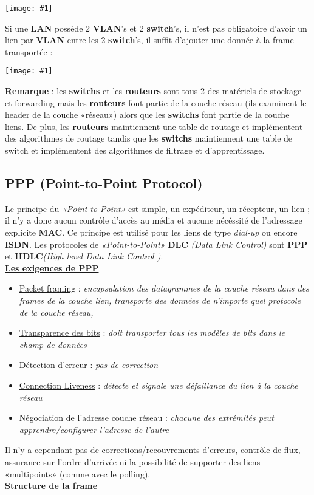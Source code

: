 \documentclass{article}
\newcommand{\ora}[1]{\textcolor{darko}{#1}}
\newcommand{\imgR}[2]{\begin{center}\texttt{[image: \#1]}\end{center}}
\newcommand{\point}[2]{\item \ora{\underline{#1}} : \textit{#2}}
\newcommand{\stitre}[1]{\noindent\textbf{\underline{#1}} \\}
\begin{document}
\imgR{CN_127.png}{250}

\noindent Si une \textbf{LAN} possède 2 \textbf{VLAN}'s et 2 \textbf{switch}'s, il n'est pas obligatoire d'avoir 
un lien par \textbf{VLAN} entre les 2 \textbf{switch}'s, il suffit d'ajouter une donnée à la frame transportée :

\imgR{CN_128.png}{300}

\noindent\underline{\textbf{Remarque}} : les \textbf{switchs} et les \textbf{routeurs} sont tous 2 des matériels 
de stockage et forwarding mais les \textbf{routeurs} font partie de la couche réseau (ils examinent le header 
de la couche «réseau») alors que les \textbf{switchs} font partie de la couche liens. De plus, les 
\textbf{routeurs} maintiennent une table de routage et implémentent des algorithmes de routage tandis que les 
\textbf{switchs} maintiennent une table de switch et implémentent des algorithmes de filtrage et d'apprentissage.

\subsection{PPP (Point-to-Point Protocol)}

Le principe du \textit{«Point-to-Point»} est simple, un expéditeur, un récepteur, un lien ; il n'y a donc aucun 
contrôle d'accès au média et aucune nécéssité de l'adressage explicite \textbf{MAC}. Ce principe est utilisé pour
les liens de type \textit{dial-up} ou encore \textbf{ISDN}. Les protocoles de \textit{«Point-to-Point»} 
\textbf{DLC} \textit{(Data Link Control)} sont \textbf{PPP} et \textbf{HDLC}\textit{(High level Data Link Control 
)}. \\

\stitre{Les exigences de PPP}
\begin{itemize}
\point{Packet framing}{encapsulation des datagrammes de la couche réseau dans des frames de la couche lien, 
transporte des données de n'importe quel protocole de la couche réseau,}
\point{Transparence des bits}{doit transporter tous les modèles de bits dans le champ de données}
\point{Détection d'erreur}{pas de correction}
\point{Connection Liveness}{détecte et signale une défaillance du lien à la couche réseau}
\point{Négociation de l'adresse couche réseau}{chacune des extrémités peut apprendre/configurer l'adresse de 
l'autre}
\end{itemize}
Il n'y a cependant pas de corrections/recouvrements d'erreurs, contrôle de flux, assurance sur l'ordre d'arrivée 
ni la possibilité de supporter des liens «multipoints» (comme avec le polling).\\
\newpage
\stitre{Structure de la frame}
\end{document}

